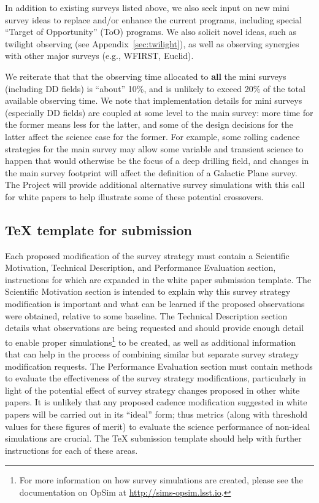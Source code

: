 \documentclass[DM,lsstdraft,toc,usenatbib]{lsstdoc}
\begin{document}
In addition to existing surveys listed above, we also seek input on new mini survey ideas 
to replace and/or enhance the current programs, including special ``Target of Opportunity'' (ToO) 
programs. We also solicit novel ideas, such as twilight observing (see Appendix~\ref{sec:twilight}),
as well as observing synergies with other major surveys (e.g., WFIRST, Euclid). 

We reiterate that that the observing time allocated to {\bf all} the mini surveys 
(including DD fields) is ``about'' 10\%, and is unlikely to exceed 20\% of the total available
observing time. We note that implementation details for mini surveys (especially DD fields)
are coupled at some level to the main survey: more time for the former means less 
for the latter, and some of the design decisions for the latter affect the science
case for the former.  For example, some rolling cadence strategies for the main survey  
may allow some variable and transient science to happen that would otherwise be the 
focus of a deep drilling field, and changes in the main survey footprint will affect the 
definition of a Galactic Plane survey. The Project will provide additional alternative 
survey simulations with this call for white papers to help illustrate some of these potential 
crossovers. 

\subsection{TeX template for submission \label{sec:textemplate}} 

Each proposed modification of the survey strategy must contain a Scientific Motivation, Technical Description, and Performance Evaluation section, instructions for which are expanded in the white paper submission template. The Scientific Motivation section is intended to explain why this survey strategy modification is important and what can be learned if the proposed observations were obtained, relative to some baseline. The Technical Description section details what observations are being requested and should provide enough detail to enable proper simulations\footnote{For more information on how survey simulations are created, please see the documentation on OpSim at \href{http://sims-opsim.lsst.io}{http://sims-opsim.lsst.io}.} to be created, as well as additional information that can help in the process of combining similar but separate survey strategy modification requests. The Performance Evaluation section must contain methods to evaluate the effectiveness of the survey strategy modifications, particularly in light of the potential effect of survey strategy changes proposed in other white papers. It is unlikely that any proposed cadence modification suggested in white papers will be carried out in its ``ideal'' form; thus metrics (along with threshold values for these figures of merit) to evaluate the science performance of non-ideal simulations are crucial. The TeX submission template should help with further instructions for each of these areas.
\end{document}
